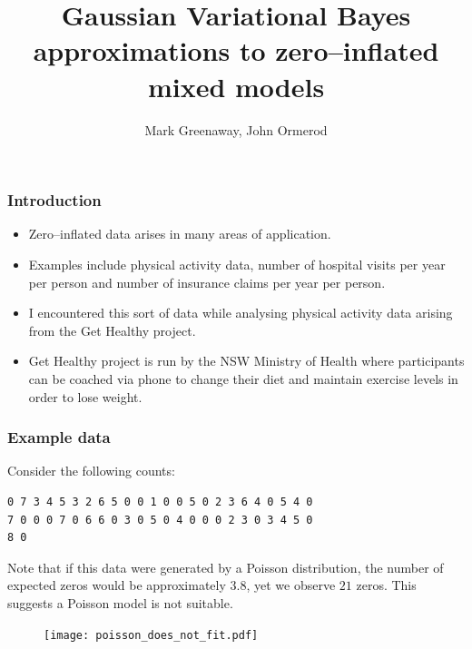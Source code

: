 \documentclass{beamer}
\title{Gaussian Variational Bayes approximations to zero--inflated mixed models}
\author{Mark Greenaway, John Ormerod}
\begin{document}
\begin{frame}
	\titlepage
\end{frame}

\begin{frame}
	\frametitle{Introduction}
	\begin{itemize}
		\item Zero--inflated data arises in many areas of application.
		\item Examples include physical activity data, number of hospital
		      visits per year per person and number of insurance claims per year per person.
		\item I encountered this sort of data  while analysing physical
		      activity data arising from the Get Healthy project.
		\item Get Healthy project is run by the NSW Ministry of Health
		      where participants can be coached via phone to change their diet and maintain exercise levels in order
		      to lose weight.
	\end{itemize}		
\end{frame}

\begin{frame}[fragile]
	\frametitle{Example data}
	Consider the following counts:
	\begin{verbatim}
0 7 3 4 5 3 2 6 5 0 0 1 0 0 5 0 2 3 6 4 0 5 4 0
7 0 0 0 7 0 6 6 0 3 0 5 0 4 0 0 0 2 3 0 3 4 5 0
8 0
	\end{verbatim}
							
			
	\noindent Note that if this data were generated by a Poisson distribution, the number of expected
	zeros would be approximately $3.8$, yet we observe $21$ zeros. This suggests a Poisson model is not suitable.
							
	\begin{figure}
		\texttt{[image: poisson\_does\_not\_fit.pdf]}
	\end{figure}%
\end{frame}
\end{document}
